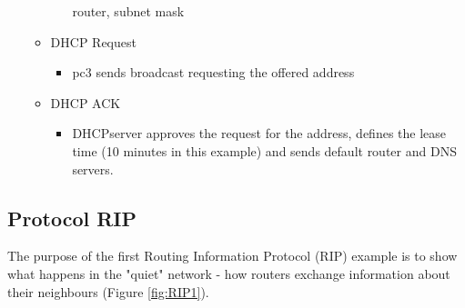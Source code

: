 \begin{enumerate}
\begin{itemize}
\begin{itemize}
router, subnet mask
      \end{itemize}    
    \item	DHCP Request
      \begin{itemize}
	\item	pc3 sends broadcast requesting the offered address
      \end{itemize}    
    \item   DHCP ACK
      \begin{itemize}
	\item	DHCPserver approves the request for the address, defines the
lease time (10 minutes in this example) and sends default router and DNS
servers.
      \end{itemize}  
  \end{itemize}
\end{enumerate}


\subsection{Protocol RIP}

The purpose of the first Routing Information Protocol (RIP) example is to show
what happens in the "quiet" network - how routers exchange information about
their neighbours (Figure \ref{fig:RIP1}).


